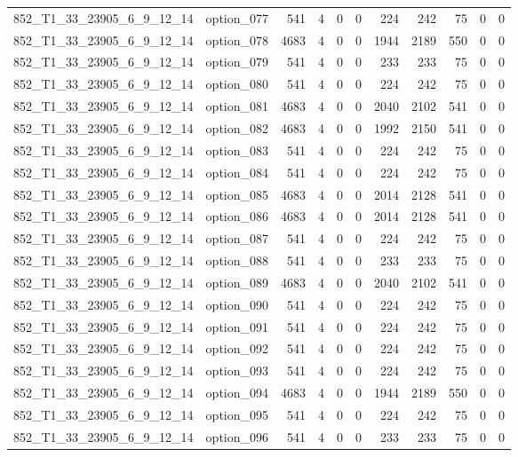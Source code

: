 \begin{tabular}{llrrrrrrrrr}
852\_T1\_33\_23905\_6\_9\_12\_14 & option\_077 & 541 & 4 & 0 & 0 & 224 & 242 & 75 & 0 & 0 \\
852\_T1\_33\_23905\_6\_9\_12\_14 & option\_078 & 4683 & 4 & 0 & 0 & 1944 & 2189 & 550 & 0 & 0 \\
852\_T1\_33\_23905\_6\_9\_12\_14 & option\_079 & 541 & 4 & 0 & 0 & 233 & 233 & 75 & 0 & 0 \\
852\_T1\_33\_23905\_6\_9\_12\_14 & option\_080 & 541 & 4 & 0 & 0 & 224 & 242 & 75 & 0 & 0 \\
852\_T1\_33\_23905\_6\_9\_12\_14 & option\_081 & 4683 & 4 & 0 & 0 & 2040 & 2102 & 541 & 0 & 0 \\
852\_T1\_33\_23905\_6\_9\_12\_14 & option\_082 & 4683 & 4 & 0 & 0 & 1992 & 2150 & 541 & 0 & 0 \\
852\_T1\_33\_23905\_6\_9\_12\_14 & option\_083 & 541 & 4 & 0 & 0 & 224 & 242 & 75 & 0 & 0 \\
852\_T1\_33\_23905\_6\_9\_12\_14 & option\_084 & 541 & 4 & 0 & 0 & 224 & 242 & 75 & 0 & 0 \\
852\_T1\_33\_23905\_6\_9\_12\_14 & option\_085 & 4683 & 4 & 0 & 0 & 2014 & 2128 & 541 & 0 & 0 \\
852\_T1\_33\_23905\_6\_9\_12\_14 & option\_086 & 4683 & 4 & 0 & 0 & 2014 & 2128 & 541 & 0 & 0 \\
852\_T1\_33\_23905\_6\_9\_12\_14 & option\_087 & 541 & 4 & 0 & 0 & 224 & 242 & 75 & 0 & 0 \\
852\_T1\_33\_23905\_6\_9\_12\_14 & option\_088 & 541 & 4 & 0 & 0 & 233 & 233 & 75 & 0 & 0 \\
852\_T1\_33\_23905\_6\_9\_12\_14 & option\_089 & 4683 & 4 & 0 & 0 & 2040 & 2102 & 541 & 0 & 0 \\
852\_T1\_33\_23905\_6\_9\_12\_14 & option\_090 & 541 & 4 & 0 & 0 & 224 & 242 & 75 & 0 & 0 \\
852\_T1\_33\_23905\_6\_9\_12\_14 & option\_091 & 541 & 4 & 0 & 0 & 224 & 242 & 75 & 0 & 0 \\
852\_T1\_33\_23905\_6\_9\_12\_14 & option\_092 & 541 & 4 & 0 & 0 & 224 & 242 & 75 & 0 & 0 \\
852\_T1\_33\_23905\_6\_9\_12\_14 & option\_093 & 541 & 4 & 0 & 0 & 224 & 242 & 75 & 0 & 0 \\
852\_T1\_33\_23905\_6\_9\_12\_14 & option\_094 & 4683 & 4 & 0 & 0 & 1944 & 2189 & 550 & 0 & 0 \\
852\_T1\_33\_23905\_6\_9\_12\_14 & option\_095 & 541 & 4 & 0 & 0 & 224 & 242 & 75 & 0 & 0 \\
852\_T1\_33\_23905\_6\_9\_12\_14 & option\_096 & 541 & 4 & 0 & 0 & 233 & 233 & 75 & 0 & 0 \\

\end{tabular}
